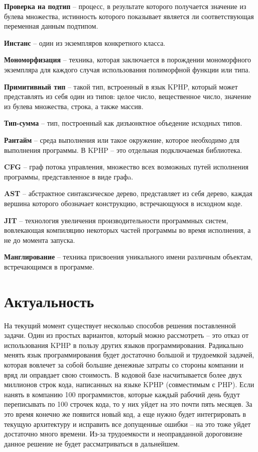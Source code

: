 \textbf{Проверка на подтип} -- процесс, в результате которого получается значение из булева множества, истинность которого показывает является ли соответствующая переменная данным подтипом.

\textbf{Инстанс} -- один из экземпляров конкретного класса.

\textbf{Мономорфизация} -- техника, которая заключается в порождении мономорфного экземпляра для каждого случая использования полиморфной функции или типа.

\textbf{Примитивный тип} -- такой тип, встроенный в язык KPHP, который может представлять из себя один из типов: целое число, вещественное число, значение из булева множества, строка, а также массив.

\textbf{Тип-сумма} -- тип, построенный как дизъюнктное объедение исходных типов.

\textbf{Рантайм} -- среда выполнения или такое окружение, которое необходимо для выполнения программы. В KPHP -- это отдельная подключаемая библиотека.

\textbf{CFG} -- граф потока управления, множество всех возможных путей исполнения программы, представленное в виде графa.

\textbf{AST} -- абстрактное синтаксическое дерево, представляет из себя дерево, каждая вершина которого обозначает конструкцию, встречающуюся в исходном коде.

\textbf{JIT} -- технология увеличения производительности программных систем, вовлекающая компиляцию некоторых частей программы во время исполнения, а не до момента запуска.

\textbf{Манглирование} -- техника присвоения уникального имени различным объектам, встречающимся в программе.

\section{Актуальность}
\label{sec:actuality}
На текущий момент существует несколько способов решения поставленной задачи.
Один из простых вариантов, который можно рассмотреть -- это отказ от использования KPHP в пользу других языков программирования.
Радикально менять язык программирования будет достаточно большой и трудоемкой задачей, которая вовлечет за собой большие денежные затраты со стороны компании и вряд ли оправдает свою стоимость.
В кодовой базе насчитывается более двух миллионов строк кода, написанных на языке KPHP (совместимым с PHP).
Если нанять в компанию 100 программистов, которые каждый рабочий день будут переписывать по 100 строчек кода, то у них уйдет на это почти пять месяцев.
За это время конечно же появится новый код, а еще нужно будет интегрировать в текущую архитектуру и исправить все допущенные ошибки -- на это тоже уйдет достаточно много времени.
Из-за трудоемкости и неоправданной дороговизне данное решение не будет рассматриваться в дальнейшем.

